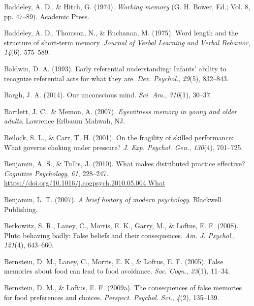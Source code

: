 \documentclass[
]{krantz}
\newlength{\cslhangindent}
\newlength{\cslentryspacingunit} %
\newenvironment{CSLReferences}[2] %
 {%
  \setlength{\parindent}{0pt}
  \ifodd #1
  \let\oldpar\par
  \def\par{\hangindent=\cslhangindent\oldpar}
  \fi
  \setlength{\parskip}{#2\cslentryspacingunit}
 }%
 {}
\begin{document}
\begin{CSLReferences}{1}{0}
\leavevmode{}%
Baddeley, A. D., \& Hitch, G. (1974). \emph{Working memory} (G. H. Bower, Ed.; Vol. 8, pp. 47--89). Academic Press.

\leavevmode{}%
Baddeley, A. D., Thomson, N., \& Buchanan, M. (1975). Word length and the structure of short-term memory. \emph{Journal of Verbal Learning and Verbal Behavior}, \emph{14}(6), 575--589.

\leavevmode{}%
Baldwin, D. A. (1993). Early referential understanding: Infants' ability to recognize referential acts for what they are. \emph{Dev. Psychol.}, \emph{29}(5), 832--843.

\leavevmode{}%
Bargh, J. A. (2014). Our unconscious mind. \emph{Sci. Am.}, \emph{310}(1), 30--37.

\leavevmode{}%
Bartlett, J. C., \& Memon, A. (2007). \emph{Eyewitness memory in young and older adults}. Lawrence Erlbaum Mahwah, NJ.

\leavevmode{}%
Beilock, S. L., \& Carr, T. H. (2001). On the fragility of skilled performance: What governs choking under pressure? \emph{J. Exp. Psychol. Gen.}, \emph{130}(4), 701--725.

\leavevmode{}%
Benjamin, A. S., \& Tullis, J. (2010). What makes distributed practice effective? \emph{Cognitive Psychology}, \emph{61}, 228--247. \url{https://doi.org/10.1016/j.cogpsych.2010.05.004.What}

\leavevmode{}%
Benjamin, L. T. (2007). \emph{A brief history of modern psychology}. Blackwell Publishing.

\leavevmode{}%
Berkowitz, S. R., Laney, C., Morris, E. K., Garry, M., \& Loftus, E. F. (2008). Pluto behaving badly: False beliefs and their consequences. \emph{Am. J. Psychol.}, \emph{121}(4), 643--660.

\leavevmode{}%
Bernstein, D. M., Laney, C., Morris, E. K., \& Loftus, E. F. (2005). False memories about food can lead to food avoidance. \emph{Soc. Cogn.}, \emph{23}(1), 11--34.

\leavevmode{}%
Bernstein, D. M., \& Loftus, E. F. (2009a). The consequences of false memories for food preferences and choices. \emph{Perspect. Psychol. Sci.}, \emph{4}(2), 135--139.


\end{CSLReferences}
\end{document}
